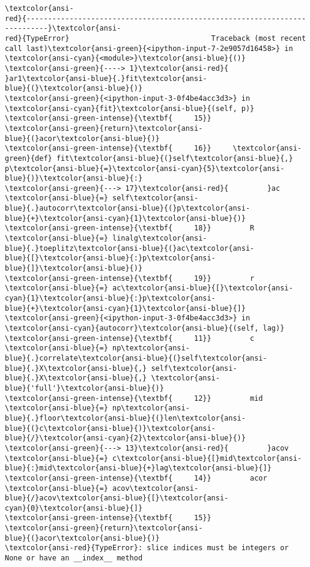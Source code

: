 \documentclass[a4paper,11pt,final]{article}
\begin{document}
\begin{Verbatim}[commandchars=\\\{\},frame=leftline,fontsize=\small, xleftmargin=0.5em]
\textcolor{ansi-
red}{---------------------------------------------------------------------------}\textcolor{ansi-
red}{TypeError}                                 Traceback (most recent
call last)\textcolor{ansi-green}{<ipython-input-7-2e9057d16458>} in
\textcolor{ansi-cyan}{<module>}\textcolor{ansi-blue}{()}
\textcolor{ansi-green}{----> 1}\textcolor{ansi-red}{
}ar1\textcolor{ansi-blue}{.}fit\textcolor{ansi-
blue}{(}\textcolor{ansi-blue}{)}
\textcolor{ansi-green}{<ipython-input-3-0f4be4acc3d3>} in
\textcolor{ansi-cyan}{fit}\textcolor{ansi-blue}{(self, p)}
\textcolor{ansi-green-intense}{\textbf{     15}}
\textcolor{ansi-green}{return}\textcolor{ansi-
blue}{(}acor\textcolor{ansi-blue}{)}
\textcolor{ansi-green-intense}{\textbf{     16}}     \textcolor{ansi-
green}{def} fit\textcolor{ansi-blue}{(}self\textcolor{ansi-blue}{,}
p\textcolor{ansi-blue}{=}\textcolor{ansi-cyan}{5}\textcolor{ansi-
blue}{)}\textcolor{ansi-blue}{:}
\textcolor{ansi-green}{---> 17}\textcolor{ansi-red}{         }ac
\textcolor{ansi-blue}{=} self\textcolor{ansi-
blue}{.}autocorr\textcolor{ansi-blue}{(}p\textcolor{ansi-
blue}{+}\textcolor{ansi-cyan}{1}\textcolor{ansi-blue}{)}
\textcolor{ansi-green-intense}{\textbf{     18}}         R
\textcolor{ansi-blue}{=} linalg\textcolor{ansi-
blue}{.}toeplitz\textcolor{ansi-blue}{(}ac\textcolor{ansi-
blue}{[}\textcolor{ansi-blue}{:}p\textcolor{ansi-
blue}{]}\textcolor{ansi-blue}{)}
\textcolor{ansi-green-intense}{\textbf{     19}}         r
\textcolor{ansi-blue}{=} ac\textcolor{ansi-blue}{[}\textcolor{ansi-
cyan}{1}\textcolor{ansi-blue}{:}p\textcolor{ansi-
blue}{+}\textcolor{ansi-cyan}{1}\textcolor{ansi-blue}{]}
\textcolor{ansi-green}{<ipython-input-3-0f4be4acc3d3>} in
\textcolor{ansi-cyan}{autocorr}\textcolor{ansi-blue}{(self, lag)}
\textcolor{ansi-green-intense}{\textbf{     11}}         c
\textcolor{ansi-blue}{=} np\textcolor{ansi-
blue}{.}correlate\textcolor{ansi-blue}{(}self\textcolor{ansi-
blue}{.}X\textcolor{ansi-blue}{,} self\textcolor{ansi-
blue}{.}X\textcolor{ansi-blue}{,} \textcolor{ansi-
blue}{'full'}\textcolor{ansi-blue}{)}
\textcolor{ansi-green-intense}{\textbf{     12}}         mid
\textcolor{ansi-blue}{=} np\textcolor{ansi-
blue}{.}floor\textcolor{ansi-blue}{(}len\textcolor{ansi-
blue}{(}c\textcolor{ansi-blue}{)}\textcolor{ansi-
blue}{/}\textcolor{ansi-cyan}{2}\textcolor{ansi-blue}{)}
\textcolor{ansi-green}{---> 13}\textcolor{ansi-red}{         }acov
\textcolor{ansi-blue}{=} c\textcolor{ansi-blue}{[}mid\textcolor{ansi-
blue}{:}mid\textcolor{ansi-blue}{+}lag\textcolor{ansi-blue}{]}
\textcolor{ansi-green-intense}{\textbf{     14}}         acor
\textcolor{ansi-blue}{=} acov\textcolor{ansi-
blue}{/}acov\textcolor{ansi-blue}{[}\textcolor{ansi-
cyan}{0}\textcolor{ansi-blue}{]}
\textcolor{ansi-green-intense}{\textbf{     15}}
\textcolor{ansi-green}{return}\textcolor{ansi-
blue}{(}acor\textcolor{ansi-blue}{)}
\textcolor{ansi-red}{TypeError}: slice indices must be integers or
None or have an __index__ method
\end{Verbatim}
\end{document}
